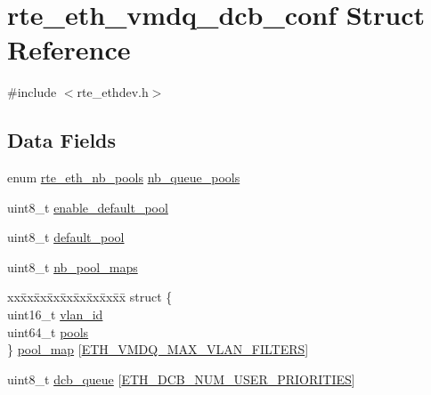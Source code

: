 \hypertarget{structrte__eth__vmdq__dcb__conf}{}\section{rte\+\_\+eth\+\_\+vmdq\+\_\+dcb\+\_\+conf Struct Reference}
\label{structrte__eth__vmdq__dcb__conf}


{\ttfamily \#include $<$rte\+\_\+ethdev.\+h$>$}

\subsection*{Data Fields}
\begin{DoxyCompactItemize}
\item 
enum \hyperlink{rte__ethdev_8h_a012a874434677984af1f026ad585dd0d}{rte\+\_\+eth\+\_\+nb\+\_\+pools} \hyperlink{structrte__eth__vmdq__dcb__conf_a1576f028debf3f0a3d4a09ee5285895c}{nb\+\_\+queue\+\_\+pools}
\item 
uint8\+\_\+t \hyperlink{structrte__eth__vmdq__dcb__conf_ac97924c8c390cedbe8533423062ca347}{enable\+\_\+default\+\_\+pool}
\item 
uint8\+\_\+t \hyperlink{structrte__eth__vmdq__dcb__conf_a6024467b1697aea1e1c8eb5fd93b0808}{default\+\_\+pool}
\item 
uint8\+\_\+t \hyperlink{structrte__eth__vmdq__dcb__conf_aa1cd654aea0030ab5a6c0b4371467c67}{nb\+\_\+pool\+\_\+maps}
\item 
\begin{tabbing}
xx\=xx\=xx\=xx\=xx\=xx\=xx\=xx\=xx\=\kill
struct \{\\
\>uint16\_t \hyperlink{structrte__eth__vmdq__dcb__conf_ad9a532da576820f8630b96c16692aa5a}{vlan\_id}\\
\>uint64\_t \hyperlink{structrte__eth__vmdq__dcb__conf_a541271d53b15080c2cb0aedb4364572c}{pools}\\
\} \hyperlink{structrte__eth__vmdq__dcb__conf_adbf609ab360cbc6b7029843a233220f9}{pool\_map} \mbox{[}\hyperlink{rte__ethdev_8h_a606a6b69adcfa6dd6c3fa4a31688bd4c}{ETH\_VMDQ\_MAX\_VLAN\_FILTERS}\mbox{]}\\

\end{tabbing}\item 
uint8\+\_\+t \hyperlink{structrte__eth__vmdq__dcb__conf_a408b6ddd20adea68e86b4a90b4780264}{dcb\+\_\+queue} \mbox{[}\hyperlink{rte__ethdev_8h_a825a952bfb398214537ed14e60af758d}{E\+T\+H\+\_\+\+D\+C\+B\+\_\+\+N\+U\+M\+\_\+\+U\+S\+E\+R\+\_\+\+P\+R\+I\+O\+R\+I\+T\+I\+E\+S}\mbox{]}
\end{DoxyCompactItemize}


